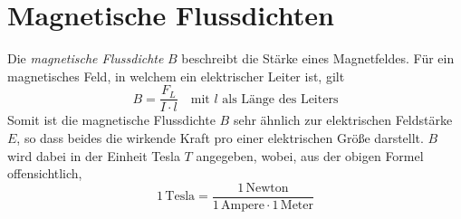 \documentclass{article}
\newcommand{\ounit}[1]{
 1\,\text{#1} 
}
\begin{document}
\section{Magnetische Flussdichten}
Die \emph{magnetische Flussdichte} $B$ beschreibt die Stärke eines Magnetfeldes. Für ein magnetisches Feld, in welchem ein elektrischer Leiter ist, gilt
\[
 B = \frac{F_L}{I \cdot l} 
 \quad \text{mit $l$ als Länge des Leiters} 
\]
Somit ist die magnetische Flussdichte $B$ sehr ähnlich zur elektrischen Feldstärke $E$, so dass beides die wirkende Kraft pro einer elektrischen Größe darstellt. \newline
$B$ wird dabei in der Einheit Tesla $T$ angegeben, wobei, aus der obigen Formel offensichtlich,
\[ 
 \ounit{Tesla} = \frac{\ounit{Newton}}{\ounit{Ampere} \cdot \ounit{Meter}}
\] 
\end{document}
